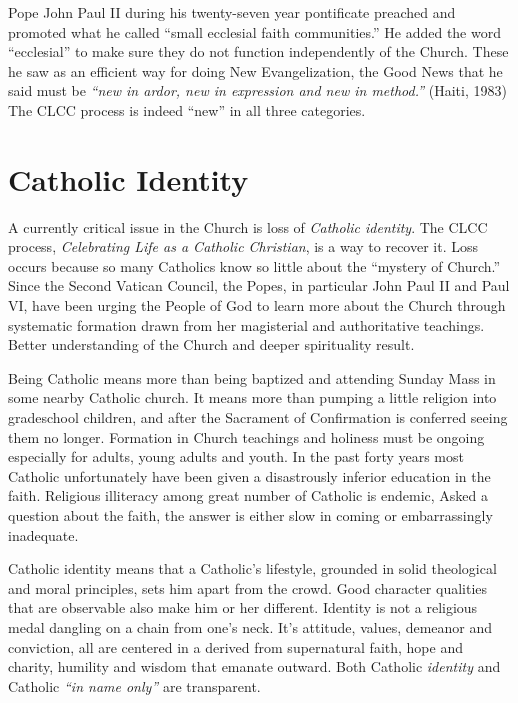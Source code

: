 \documentclass{article}
\begin{document}
Pope John Paul II during his twenty-seven year pontificate preached and promoted
what he called ``small ecclesial faith communities.'' He added the word
``ecclesial'' to make sure they do not function independently of the
Church. These he saw as an efficient way for doing New Evangelization, the Good
News that he said must be \emph{``new in ardor, new in expression and new in
method.''}  (Haiti, 1983) The CLCC process is indeed ``new'' in all three
categories.


\section{Catholic Identity}

A currently critical issue in the Church is loss of \emph{Catholic
identity}. The CLCC process, \emph{Celebrating Life as a Catholic Christian}, is
a way to recover it. Loss occurs because so many Catholics know so little about
the ``mystery of Church.'' Since the Second Vatican Council, the Popes, in
particular John Paul II and Paul VI, have been urging the People of God to learn
more about the Church through systematic formation drawn from her magisterial
and authoritative teachings. Better understanding of the Church and deeper
spirituality result.

Being Catholic means more than being baptized and attending Sunday Mass in some
nearby Catholic church. It means more than pumping a little religion into
gradeschool children, and after the Sacrament of Confirmation is conferred
seeing them no longer. Formation in Church teachings and holiness must be
ongoing especially for adults, young adults and youth. In the past forty years
most Catholic unfortunately have been given a disastrously inferior education in
the faith. Religious illiteracy among great number of Catholic is endemic, Asked
a question about the faith, the answer is either slow in coming or
embarrassingly inadequate.

Catholic identity means that a Catholic's lifestyle, grounded in solid
theological and moral principles, sets him apart from the crowd. Good character
qualities that are observable also make him or her different. Identity is not a
religious medal dangling on a chain from one's neck. It's attitude, values,
demeanor and conviction, all are centered in a derived from supernatural faith,
hope and charity, humility and wisdom that emanate outward. Both Catholic
\emph{identity} and Catholic \emph{``in name only''} are transparent.
\end{document}
